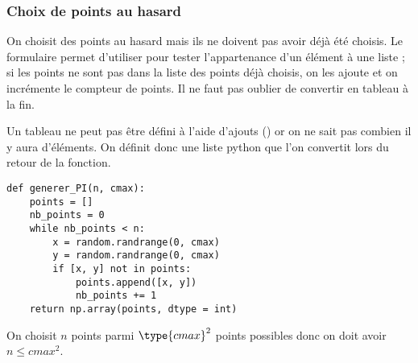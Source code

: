 \subsubsection{Choix de points au hasard}
\begin{Exercise}[title = {{\bf I.A.1)} a)}]
On choisit des points au hasard mais ils ne doivent pas avoir déjà été choisis.
Le formulaire permet d'utiliser  pour tester l'appartenance d'un élément à une liste ; si les points ne sont pas dans la liste des points déjà choisis, on les ajoute et on incrémente le compteur de points. Il ne faut pas oublier de convertir en tableau  à la fin.

Un tableau  ne peut pas être défini à l'aide d'ajouts () or on ne sait pas combien il y aura d'éléments. On définit donc une liste python que l'on convertit lors du retour de la fonction.

\begin{lstlisting}
def generer_PI(n, cmax):
    points = []
    nb_points = 0
    while nb_points < n:
        x = random.randrange(0, cmax)
        y = random.randrange(0, cmax)
        if [x, y] not in points:
            points.append([x, y])
            nb_points += 1 
    return np.array(points, dtype = int)
\end{lstlisting}
\end{Exercise}
\begin{Exercise}[title = {{\bf I.A.1)} b)}]
On choisit $n$ points parmi $\type{cmax}^2$ points possibles donc on doit avoir $n \le cmax^2$.
\end{Exercise}
\newpage
